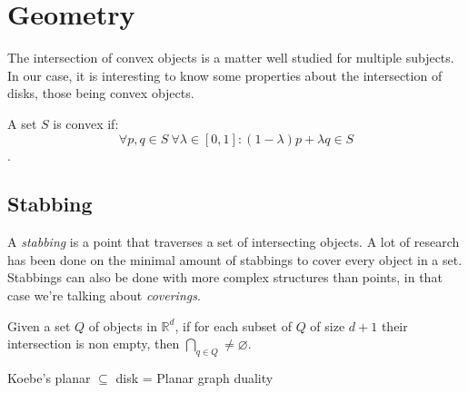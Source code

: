 \section{Geometry}
\label{sec:geom}

The intersection of convex objects is a matter well studied for multiple
subjects. In our case, it is interesting to know some properties about
the intersection of disks, those being convex objects.

A set $S$ is convex if:
$$\forall p,q \in S\  \forall \lambda \in [0,1]: (1-\lambda)p + \lambda q \in S$$.

\subsection{Stabbing}
A \textit{stabbing} is a point that traverses a set of intersecting objects. A lot of
research has been done \cite{schlipf2013stabbing} on the minimal amount of stabbings to
cover every object in a set. Stabbings can also be done with more complex structures
than points, in that case we're talking about \textit{coverings}.

\begin{theorem}[Helly]
  Given a set $Q$ of objects in $\mathbb{R}^d$, if for each subset of $Q$ of
  size $d+1$ their intersection is non empty, then $\bigcap_{q \in Q} \neq
  \varnothing$. \cite{Helly1923175}
\end{theorem}

Koebe's planar $\subseteq$ disk
  = Planar graph duality
